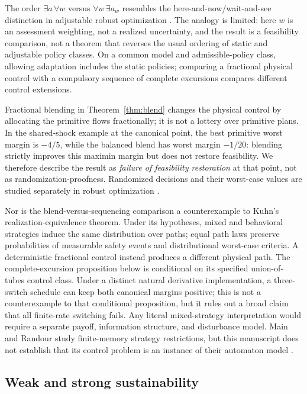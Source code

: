 The order $\exists a\,\forall w$ versus $\forall w\,\exists a_w$ resembles the here-and-now/wait-and-see distinction in adjustable robust optimization \citep{BenTal2004,BenTal2009}. The analogy is limited: here $w$ is an assessment weighting, not a realized uncertainty, and the result is a feasibility comparison, not a theorem that reverses the usual ordering of static and adjustable policy classes. On a common model and admissible-policy class, allowing adaptation includes the static policies; comparing a fractional physical control with a compulsory sequence of complete excursions compares different control extensions.

Fractional blending in Theorem~\ref{thm:blend} changes the physical control by allocating the primitive flows fractionally; it is not a lottery over primitive plans. In the shared-shock example at the canonical point, the best primitive worst margin is $-4/5$, while the balanced blend has worst margin $-1/20$: blending strictly improves this maximin margin but does not restore feasibility. We therefore describe the result as \emph{failure of feasibility restoration} at that point, not as randomization-proofness. Randomized decisions and their worst-case values are studied separately in robust optimization \citep{Delage2019,KrauseRoperGolovin2011,VorobeychikLi2014,Sinha2018,Sessa2020}.

Nor is the blend-versus-sequencing comparison a counterexample to Kuhn's realization-equivalence theorem. Under its hypotheses, mixed and behavioral strategies induce the same distribution over paths; equal path laws preserve probabilities of measurable safety events and distributional worst-case criteria. A deterministic fractional control instead produces a different physical path. The complete-excursion proposition below is conditional on its specified union-of-tubes control class. Under a distinct natural derivative implementation, a three-switch schedule can keep both canonical margins positive; this is not a counterexample to that conditional proposition, but it rules out a broad claim that all finite-rate switching fails. Any literal mixed-strategy interpretation would require a separate payoff, information structure, and disturbance model. Main and Randour study finite-memory strategy restrictions, but this manuscript does not establish that its control problem is an instance of their automaton model \citep{Kuhn1953,MainRandour2024}.

\subsection{Weak and strong sustainability}


